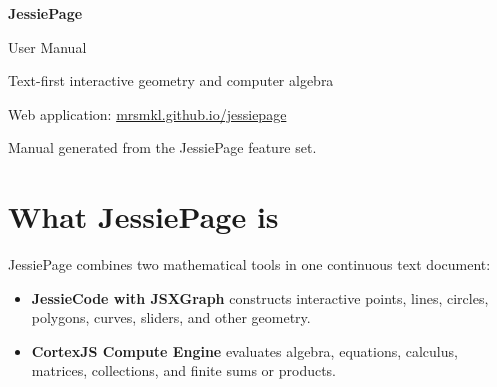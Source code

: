 \documentclass[11pt,a4paper]{article}
\begin{document}
\begin{titlepage}
  \pagecolor{paper}
  \color{ink}
  \vspace*{24mm}
  {\fontsize{34}{40}\selectfont\bfseries JessiePage\par}
  \vspace{3mm}
  {\fontsize{19}{25}\selectfont User Manual\par}
  \vspace{12mm}
  {\large Text-first interactive geometry and computer algebra\par}

  \vfill

  \vfill
  {\small\color{muted}
    Web application: \href{https://mrsmkl.github.io/jessiepage/}{mrsmkl.github.io/jessiepage}\par
    Manual generated from the JessiePage feature set.\par
  }
  \vspace{8mm}
\end{titlepage}
\nopagecolor

\begingroup
\setlength{\parskip}{0pt}
\small
\tableofcontents
\endgroup
\clearpage

\section{What JessiePage is}

JessiePage combines two mathematical tools in one continuous text document:

\begin{itemize}
  \item \textbf{JessieCode with JSXGraph} constructs interactive points, lines, circles, polygons, curves, sliders, and other geometry.
  \item \textbf{CortexJS Compute Engine} evaluates algebra, equations, calculus, matrices, collections, and finite sums or products.
\end{itemize}
\end{document}
